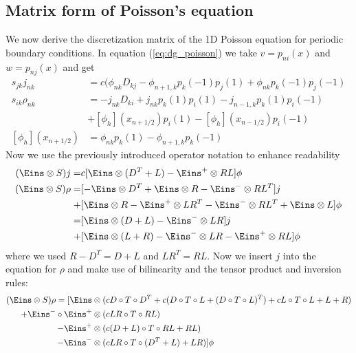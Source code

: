 \documentclass[a4paper,12pt]{scrartcl}
\begin{document}
\subsection{Matrix form of Poisson's equation}
We now derive the discretization matrix of the 1D Poisson equation for periodic
boundary conditions.
In equation (\ref{eq:dg_poisson}) we take $v=p_{ni}(x)$ and  $w=p_{nj}(x)$ 
and get
\begin{subequations}
    \begin{align}
        s_{jk} j_{nk} &= c (\phi_{nk}D_{kj} - \phi_{n+1,k}p_k(-1)p_j(1) + \phi_{nk}p_k(-1)p_j(-1)\\
        s_{ik} \rho_{nk} &= -j_{nk} D_{ki} + j_{nk}p_k(1)p_i(1) - j_{n-1,k}p_k(1)p_i(-1) \nonumber \\
         &+ [\phi_h](x_{n+1/2}) p_i(1) - [\phi_h](x_{n-1/2})p_i(-1) \\
        [\phi_h](x_{n+1/2}) &= \phi_{nk}p_k(1) - \phi_{n+1,k}p_k(-1)
        \label{ eq:projection}
    \end{align}
\end{subequations}
Now we use the previously introduced operator notation to enhance readability
\begin{subequations}
    \begin{align}
        (\Eins \otimes S)j =& c[\Eins\otimes (D^T+L) - \Eins^{+} \otimes RL] \phi \\
        (\Eins \otimes S)\rho =& [ -\Eins \otimes D^T + \Eins\otimes R - \Eins^{-} \otimes RL^T]j  \nonumber \\
                +&[\Eins\otimes R - \Eins^{+}\otimes LR^T - \Eins^{-} \otimes RL^T + \Eins \otimes L]\phi\nonumber \\
                =& [\Eins\otimes (D+L) - \Eins^-\otimes LR]j \nonumber \\
                +& [\Eins\otimes (L+R) - \Eins^{-}\otimes LR  - \Eins^{+} \otimes RL] \phi
    \end{align}
    \label{eq:projection_operator_notation}
\end{subequations}
where we used $R-D^T = D+L$ and $LR^T = RL$. Now we insert $j$ into the equation
for $\rho$ and make use of bilinearity and the tensor product and inversion rules:
\begin{align}
    (\Eins\otimes S)\rho = 
    [\Eins&\otimes( cD\circ T\circ D^T + c(D\circ T\circ L+(D\circ T\circ  L)^T) 
                    + cL\circ T\circ L + L + R) \nonumber \\
            + \Eins^-\circ\Eins^+&\otimes (cLR\circ T\circ RL) \nonumber \\
            - \Eins^+&\otimes (c(D+L)\circ T \circ RL + RL) \nonumber \\
            - \Eins^-&\otimes (cLR\circ T\circ (D^T+L) + LR )]\phi
    \label{eq:laplace_operator}
\end{align}
\end{document}
